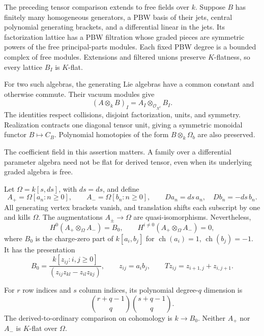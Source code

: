 The preceding tensor comparison extends to free fields over $k$.
Suppose $B$ has finitely many homogeneous generators, a PBW basis
of their jets, central polynomial generating brackets, and
a differential linear in the jets. Its factorization lattice
has a PBW filtration whose graded pieces are symmetric powers
of the free principal-parts modules. Each fixed PBW degree
is a bounded complex of free modules. Extensions and filtered
unions preserve $K$-flatness, so every lattice $B_I$ is $K$-flat.

For two such algebras, the generating Lie algebras have a common
constant and otherwise commute. Their vacuum modules give
\[
 (A\otimes_k B)_I=A_I\otimes_{\mathcal O_{X^I}}B_I.
\]
The identities respect collisions, disjoint factorization,
units, and symmetry. Realization contracts one diagonal tensor
unit, giving a symmetric monoidal functor
$B\mapsto C_B$. Polynomial homotopies of the form
$B\otimes_k\Omega_b$ are also preserved.

The coefficient field in this assertion matters. A family over
a differential parameter algebra need not be flat for derived
tensor, even when its underlying graded algebra is free.

\begin{proposition}
\label{v4-arith:centers:prop:parameter-tensor}
Let $\Omega=k[s,ds]$, with $d s=ds$, and define
\[
 A_+=\Omega[a_n:n\geq0],\qquad
 A_-=\Omega[b_n:n\geq0],
 \qquad Da_n=ds\,a_n,\quad Db_n=-ds\,b_n.
\]
All generating vertex brackets vanish, and translation shifts
each subscript by one and kills $\Omega$.
The augmentations $A_\pm\to\Omega$ are quasi-isomorphisms.
Nevertheless,
\[
 H^0(A_+\otimes_\Omega A_-)=B_0,\qquad
 H^{i\ne0}(A_+\otimes_\Omega A_-)=0,
\]
where $B_0$ is the charge-zero part of $k[a_i,b_j]$ for
$\operatorname{ch}(a_i)=1$, $\operatorname{ch}(b_j)=-1$.
It has the presentation
\[
 B_0=
 \frac{k[z_{ij}:i,j\geq0]}
 {(z_{ij}z_{kl}-z_{il}z_{kj})},\qquad z_{ij}=a_ib_j,
 \qquad Tz_{ij}=z_{i+1,j}+z_{i,j+1}.
\]

For $r$ row indices and $s$ column indices, its polynomial
degree-$q$ dimension is
\[
 \binom{r+q-1}{q}\binom{s+q-1}{q}.
\]
The derived-to-ordinary comparison on cohomology is $k\to B_0$.
Neither $A_+$ nor $A_-$ is $K$-flat over $\Omega$.
\end{proposition}

